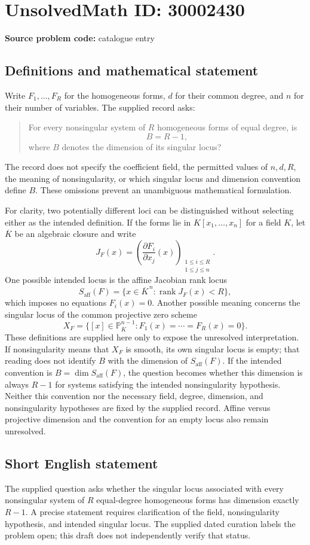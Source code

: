\documentclass[11pt]{article}
\begin{document}
\section*{UnsolvedMath ID: 30002430}
\textbf{Source problem code:} catalogue entry
\subsection{Definitions and mathematical statement}
Write \(F_1,\ldots,F_R\) for the homogeneous forms, \(d\) for their common degree, and \(n\) for their number of variables. The supplied record asks:
\begin{quote}
For every nonsingular system of \(R\) homogeneous forms of equal degree, is
\[
B=R-1,
\]
where \(B\) denotes the dimension of its singular locus?
\end{quote}
The record does not specify the coefficient field, the permitted values of \(n,d,R\), the meaning of nonsingularity, or which singular locus and dimension convention define \(B\). These omissions prevent an unambiguous mathematical formulation.

For clarity, two potentially different loci can be distinguished without selecting either as the intended definition. If the forms lie in \(K[x_1,\ldots,x_n]\) for a field \(K\), let \(\overline K\) be an algebraic closure and write
\[
J_F(x)=\left(\frac{\partial F_i}{\partial x_j}(x)\right)_{\substack{1\leq i\leq R\\1\leq j\leq n}}.
\]
One possible intended locus is the affine Jacobian rank locus
\[
S_{\mathrm{aff}}(F)=\{x\in\overline K^{\,n}:\operatorname{rank}J_F(x)<R\},
\]
which imposes no equations \(F_i(x)=0\). Another possible meaning concerns the singular locus of the common projective zero scheme
\[
X_F=\{[x]\in\mathbb P^{n-1}_{\overline K}:F_1(x)=\cdots=F_R(x)=0\}.
\]
These definitions are supplied here only to expose the unresolved interpretation. If nonsingularity means that \(X_F\) is smooth, its own singular locus is empty; that reading does not identify \(B\) with the dimension of \(S_{\mathrm{aff}}(F)\). If the intended convention is \(B=\dim S_{\mathrm{aff}}(F)\), the question becomes whether this dimension is always \(R-1\) for systems satisfying the intended nonsingularity hypothesis. Neither this convention nor the necessary field, degree, dimension, and nonsingularity hypotheses are fixed by the supplied record. Affine versus projective dimension and the convention for an empty locus also remain unresolved.
\subsection{Short English statement}
The supplied question asks whether the singular locus associated with every nonsingular system of \(R\) equal-degree homogeneous forms has dimension exactly \(R-1\). A precise statement requires clarification of the field, nonsingularity hypothesis, and intended singular locus. The supplied dated curation labels the problem open; this draft does not independently verify that status.
\end{document}

